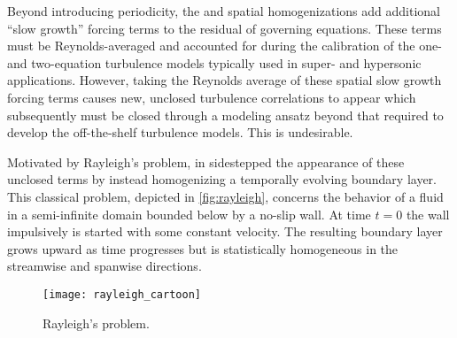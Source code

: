 Beyond introducing periodicity, the \citet{Spalart1988Direct} and \citet{Guarini1998} spatial homogenizations add additional ``slow
growth'' forcing terms to the residual of governing equations.  These terms
must be Reynolds-averaged and accounted for during the calibration of the one-
and two-equation turbulence models typically used in super- and hypersonic
applications.  However, taking the Reynolds average of these spatial slow growth forcing terms causes new,
unclosed turbulence correlations to appear which subsequently must be closed
through a modeling ansatz beyond that required to develop the off-the-shelf
turbulence models.  This is undesirable.

Motivated by Rayleigh's problem,
in \citeyear{Topalian2011Slow}
\citet{Topalian2011Slow} sidestepped the appearance of these unclosed terms by
instead homogenizing a temporally evolving boundary layer.  This classical
problem, depicted in \autoref{fig:rayleigh}, concerns the behavior of a fluid
in a semi-infinite domain bounded below by a no-slip wall.  At time $t=0$ the
wall impulsively is started with some constant velocity.  The resulting
boundary layer grows upward as time progresses but is statistically
homogeneous in the streamwise and spanwise directions.

\begin{figure}
\centering
\texttt{[image: rayleigh\_cartoon]}
\caption{Rayleigh's problem. \label{fig:rayleigh}}
\end{figure}

